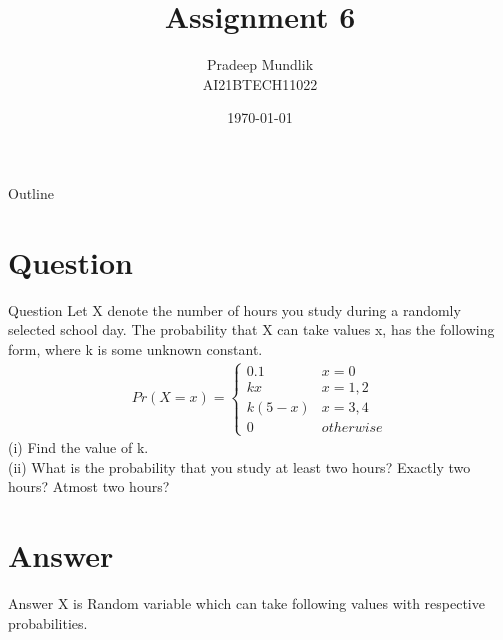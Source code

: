 \documentclass{beamer}
\title{Assignment 6}%
\author{Pradeep Mundlik \\ AI21BTECH11022}
\date{\today}
\begin{document}
\begin{frame}
    \titlepage 
\end{frame}



\begin{frame}{Outline}
    \tableofcontents
\end{frame}


\section{Question}
\begin{frame}{Question}
    Let X denote the number of hours you study during a randomly selected
    school day. The probability that X can take values x, has the following form, where
    k is some unknown constant. \\
    \begin{align}
        Pr(X = x) = 
        \begin{cases}
            0.1 & x = 0 \\
            kx & x = 1,2 \\
            k\left(5-x\right) & x = 3,4 \\
            0 & otherwise
        \end{cases}
    \end{align}
    (i) Find the value of k.\\
    (ii) What is the probability that you study at least two hours? Exactly two hours?
    Atmost two hours? 
\end{frame}

\section{Answer}
\begin{frame}{Answer}
    X is Random variable which can take following values with respective probabilities. 
    \begin{table}[htb]
        \tiny
        \caption{}
        \end{table}
\end{frame}
\end{document}
